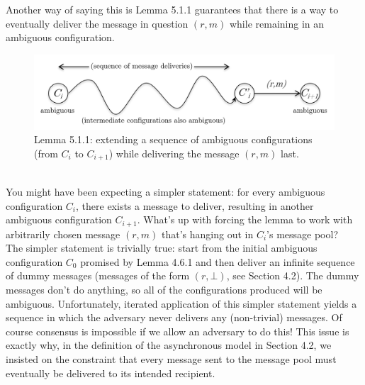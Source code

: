 Another way of saying this is Lemma 5.1.1 guarantees that
there is a way to eventually deliver the
message in question $(r,m)$
while remaining in an ambiguous configuration. 
\begin{figure}[h]
    \centering
    \includegraphics[scale = 0.5]{figures/f16.png}
    \caption{ Lemma 5.1.1: extending a sequence of ambiguous configurations (from $C_i$ to $C_{i+1}$) while delivering the message $(r, m)$ last.}
    \label{fig:mesh1}
\end{figure}\\

You might have been expecting a simpler statement: for every ambiguous configuration $C_i$, there exists a message to deliver, resulting in another ambiguous configuration $C_{i+1}$. What’s up with forcing the lemma to work with arbitrarily chosen message $(r, m)$ that’s hanging out in $C_i$’s message pool?\\
The simpler statement is trivially true: start from the initial ambiguous configuration $C_0$
promised by Lemma 4.6.1 and then deliver an infinite sequence of dummy messages (messages of the form $(r, \bot)$, see Section 4.2). The dummy messages don’t do anything, so all of the configurations produced will be ambiguous. Unfortunately, iterated application of this
simpler statement yields a sequence in which the adversary never delivers any (non-trivial)
messages. Of course consensus is impossible if we allow an adversary to do this! This issue
is exactly why, in the definition of the asynchronous model in Section 4.2, we insisted on the constraint that every message sent to the message pool must eventually be delivered to its intended recipient.\\

